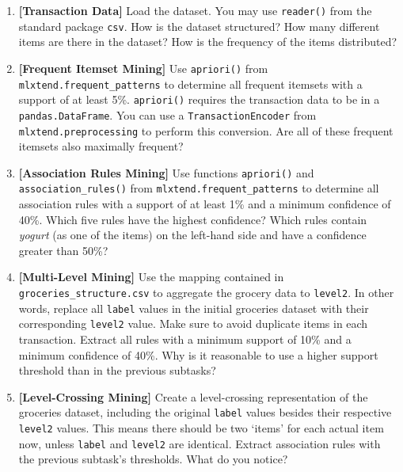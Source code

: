 \documentclass[12pt]{article}
\newcommand{\code}[1]{\textcolor{kitgreen}{\texttt{#1}}}
\newcommand{\taskname}[1]{\textcolor{kitblue}{\textbf{[#1]}}}
\begin{document}
\begin{enumerate}[label=\alph*), left=0pt, itemsep=12pt]
	\item
	\taskname{Transaction Data}
	Load the dataset.
	You may use \code{reader()} from the standard package \code{csv}.
	\newline
	How is the dataset structured?
	How many different items are there in the dataset?
	How is the frequency of the items distributed?
	\item
	\taskname{Frequent Itemset Mining}
	Use \code{apriori()} from \code{mlxtend.frequent\_patterns} to determine all frequent itemsets with a support of at least 5\%.
	\code{apriori()} requires the transaction data to be in a \code{pandas.DataFrame}.
	You can use a \code{TransactionEncoder} from \code{mlxtend.preprocessing} to perform this conversion.
	\newline
	Are all of these frequent itemsets also maximally frequent?
	\item
	\taskname{Association Rules Mining}
	Use functions \code{apriori()} and \code{association\_rules()} from \code{mlxtend.frequent\_patterns} to determine all association rules with a support of at least 1\% and a minimum confidence of 40\%.
	\newline
	Which five rules have the highest confidence?
	Which rules contain \textit{yogurt} (as one of the items) on the left-hand side and have a confidence greater than 50\%?
	\item
	\taskname{Multi-Level Mining}
	Use the mapping contained in \code{groceries\_structure.csv} to aggregate the grocery data to \code{level2}.
	In other words, replace all \code{label} values in the initial groceries dataset with their corresponding \code{level2} value.
	Make sure to avoid duplicate items in each transaction.
	Extract all rules with a minimum support of 10\% and a minimum confidence of 40\%.
	\newline
	Why is it reasonable to use a higher support threshold than in the previous subtasks?
	\item
	\taskname{Level-Crossing Mining}
	Create a level-crossing representation of the groceries dataset, including the original \code{label} values besides their respective \code{level2} values.
	This means there should be two `items' for each actual item now, unless \code{label} and \code{level2} are identical.
	Extract association rules with the previous subtask's thresholds.
	\newline
	What do you notice?
\end{enumerate}
\end{document}
